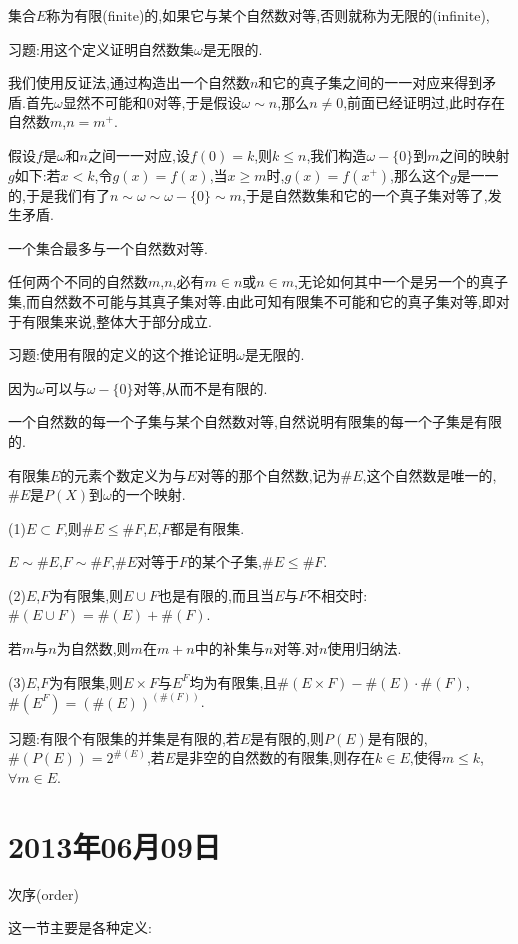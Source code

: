 \documentclass[12pt,a4paper,openany]{book}
\begin{document}
集合$E$称为有限(finite)的,如果它与某个自然数对等,否则就称为无限的(infinite),

习题:用这个定义证明自然数集$\omega$是无限的.

我们使用反证法,通过构造出一个自然数$n$和它的真子集之间的一一对应来得到矛盾.首先$\omega$显然不可能和$0$对等,于是假设$\omega \sim n$,那么$n \neq 0$,前面已经证明过,此时存在自然数$m$,$n=m^+$.

假设$f$是$\omega$和$n$之间一一对应,设$f(0)=k$,则$k \le n$,我们构造$\omega-\{0\}$到$m$之间的映射$g$如下:若$x<k$,令$g(x)=f(x)$,当$x \ge m$时,$g(x)=f(x^+)$,那么这个$g$是一一的,于是我们有了$n \sim \omega \sim \omega-\{0\} \sim m$,于是自然数集和它的一个真子集对等了,发生矛盾.

一个集合最多与一个自然数对等.

任何两个不同的自然数$m$,$n$,必有$m \in n$或$n \in m$,无论如何其中一个是另一个的真子集,而自然数不可能与其真子集对等.由此可知有限集不可能和它的真子集对等,即对于有限集来说,整体大于部分成立.

习题:使用有限的定义的这个推论证明$\omega$是无限的.

因为$\omega$可以与$\omega-\{0\}$对等,从而不是有限的.

一个自然数的每一个子集与某个自然数对等,自然说明有限集的每一个子集是有限的.

有限集$E$的元素个数定义为与$E$对等的那个自然数,记为$\#E$,这个自然数是唯一的,$\#E$是$P(X)$到$\omega$的一个映射.

(1)$E \subset F$,则$\#E \le \#F$,$E$,$F$都是有限集.

$E \sim \#E$,$F \sim \#F$,$\#E$对等于$F$的某个子集,$\#E \le \#F$.

(2)$E$,$F$为有限集,则$E \cup F$也是有限的,而且当$E$与$F$不相交时:$\#(E \cup F) = \#(E) + \#(F)$.

若$m$与$n$为自然数,则$m$在$m+n$中的补集与$n$对等.对$n$使用归纳法.

(3)$E$,$F$为有限集,则$E \times F$与$E^F$均为有限集,且$\#(E \times F) - \#(E) \cdot \#(F)$,$\#(E^F)=(\#(E))^{(\#(F))}$.

习题:有限个有限集的并集是有限的,若$E$是有限的,则$P(E)$是有限的,$\#(P(E))=2^{\#(E)}$,若$E$是非空的自然数的有限集,则存在$k \in E$,使得$m \le k$,$\forall m \in E$.

\section{2013年06月09日}
次序(order)

这一节主要是各种定义:
\end{document}
